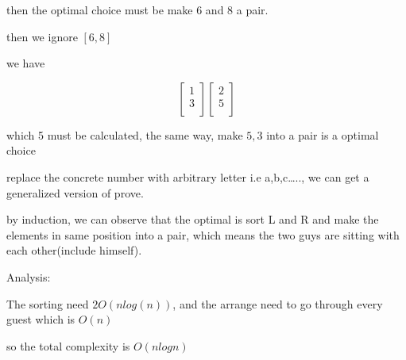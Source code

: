 \documentclass[]{article}
\begin{document}
then the optimal choice must be make 6 and 8 a pair.

then we ignore \([6,8]\)

we have

\[\left[\begin{matrix}



1\\

3\\

\end{matrix}\right]

\left[\begin{matrix}

2\\

5\\



\end{matrix}\right]\]

which 5 must be calculated, the same way, make \(5,3\) into a pair is a
optimal choice

replace the concrete number with arbitrary letter i.e a,b,c\ldots{}..,
we can get a generalized version of prove.

by induction, we can observe that the optimal is sort L and R and make
the elements in same position into a pair, which means the two guys are
sitting with each other(include himself).

Analysis:

The sorting need \(2O(nlog(n))\), and the arrange need to go through
every guest which is \(O(n)\)

so the total complexity is \(O(nlogn) \)
\end{document}
